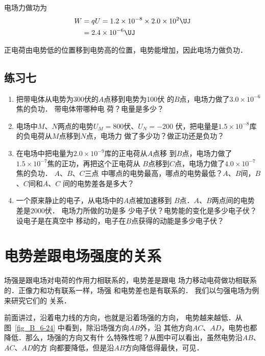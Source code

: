 \begin{solution}
电场力做功为
\[\begin{split}
    W&=qU=1.2\times10^{-8}\times2.0\times10^2 \UJ \\
&=2.4\times10^{-6} \UJ
\end{split} \]

正电荷由电势低的位置移到电势高的位置，电势能增加，因此电场力做负功．
\end{solution}

\subsection*{练习七}

\begin{enumerate}
    \item 把带电体从电势为300伏的$A$点移到电势为100伏
的$B$点，电场力做了$3.0\times10^{-6}$焦的负功．
带电体带哪种电
荷？电量是多少？
\item 电场中$M$、$N$两点的电势$U_M=800$伏、$U_N=-200$
伏，把电量是$1.5\times10^{-8}$库的负电荷从$M$点移到$N$点，电场力
做了多少功？做正功还是负功？
\item 在电场中把电量为$2.0\times10^{-9}$库的正电荷从$A$点移
到$B$点，电场力做了$1.5\times10^{-7}$焦的正功，再把这个正电荷从
$B$点移到$C$点，电场力做了$4.0\times10^{-7}$焦的负功．
$A$、$B$、$C$三点
中哪点的电势最高，哪点的电势最低？$A$、$B$间，$B$、$C$间和$A$、$C$
间的电势差各是多大？
\item 一个原来静止的电子，从电场中的$A$点被加速移到
$B$点．$A$、$B$两点间的电势差是2000伏．
电场力所做的功是多
少电子伏？电势能的变化是多少电子伏？设电子是在真空中
移动的，电子在$B$点获得的动能是多少电子伏？
\end{enumerate}


\section{电势差跟电场强度的关系}
场强是跟电场对电荷的作用力相联系的，电势差是跟电
场力移动电荷做功相联系的．正像力和功有联系一样，场强
和电势差也是有联系的．
我们以匀强电场为例来研究它们的
关系．


前面讲过，沿着电力线的方向，也就是沿着场强的方向，
电势越来越低．从图~\ref{fig_B_6-24} 中看到，除沿场强方向$AB$外，沿
其他方向$AC$、$AD$，电势也都降低．那么，场强的方向又有什
么特殊性呢？从图中可以看出，虽然电势沿$AB$、$AC$、$AD$的方
向都要降低，但是沿$AB$方向降低得最快，可见．

